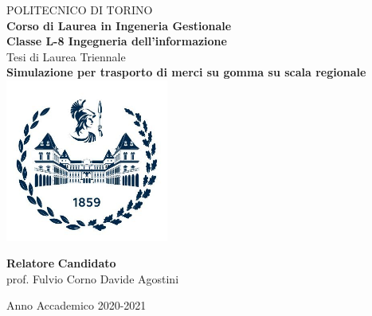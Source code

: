 \begin{titlepage}

\begin{center}

{\huge POLITECNICO DI TORINO}\\[1.5cm]
\textbf{Corso di Laurea in Ingeneria Gestionale\\Classe L-8 Ingegneria dell’informazione}\\[1.5cm]

{\Large Tesi di Laurea Triennale}\\[1cm]
\textbf{\LARGE Simulazione per trasporto di merci su gomma su scala regionale}\\[1cm]
\includegraphics[width=0.4\textwidth]{./Images/logo.jpg}
\vspace{3cm}


\begin{minipage}{0.85\textwidth}
\begin{flushleft}\large
\textbf{Relatore} \hfill \textbf{Candidato}\\
prof. Fulvio Corno \hfill Davide Agostini\\
\end{flushleft}
\end{minipage}

\vspace{\fill}

Anno Accademico 2020-2021
\end{center}

\restoregeometry %

\end{titlepage}